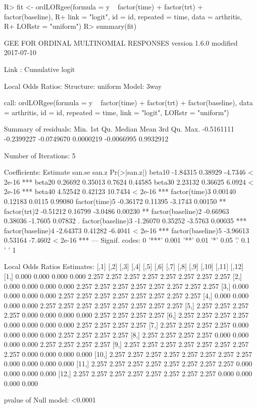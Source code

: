 \documentclass[
]{jss}
\begin{document}
\begin{CodeChunk}

\begin{CodeInput}
R>  fit <- ordLORgee(formula = y ~ factor(time) + factor(trt) + factor(baseline),
R+         link = "logit", id = id, repeated = time, data = arthritis,
R+         LORstr = "uniform")
R>  summary(fit)
\end{CodeInput}

\begin{CodeOutput}
GEE FOR ORDINAL MULTINOMIAL RESPONSES 
version 1.6.0 modified 2017-07-10 

Link : Cumulative logit 

Local Odds Ratios:
Structure:         uniform
Model:             3way

call:
ordLORgee(formula = y ~ factor(time) + factor(trt) + factor(baseline), 
    data = arthritis, id = id, repeated = time, link = "logit", 
    LORstr = "uniform")

Summary of residuals:
      Min.    1st Qu.     Median       Mean    3rd Qu.       Max. 
-0.5161111 -0.2399227 -0.0749670  0.0000219 -0.0066995  0.9932912 

Number of Iterations: 5 

Coefficients:
                  Estimate   san.se   san.z Pr(>|san.z|)    
beta10            -1.84315  0.38929 -4.7346      < 2e-16 ***
beta20             0.26692  0.35013  0.7624      0.44585    
beta30             2.23132  0.36625  6.0924      < 2e-16 ***
beta40             4.52542  0.42123 10.7434      < 2e-16 ***
factor(time)3      0.00140  0.12183  0.0115      0.99080    
factor(time)5     -0.36172  0.11395 -3.1743      0.00150 ** 
factor(trt)2      -0.51212  0.16799 -3.0486      0.00230 ** 
factor(baseline)2 -0.66963  0.38036 -1.7605      0.07832 .  
factor(baseline)3 -1.26070  0.35252 -3.5763      0.00035 ***
factor(baseline)4 -2.64373  0.41282 -6.4041      < 2e-16 ***
factor(baseline)5 -3.96613  0.53164 -7.4602      < 2e-16 ***
---
Signif. codes:  0 '***' 0.001 '**' 0.01 '*' 0.05 '.' 0.1 ' ' 1

Local Odds Ratios Estimates:
       [,1]  [,2]  [,3]  [,4]  [,5]  [,6]  [,7]  [,8]  [,9] [,10] [,11] [,12]
 [1,] 0.000 0.000 0.000 0.000 2.257 2.257 2.257 2.257 2.257 2.257 2.257 2.257
 [2,] 0.000 0.000 0.000 0.000 2.257 2.257 2.257 2.257 2.257 2.257 2.257 2.257
 [3,] 0.000 0.000 0.000 0.000 2.257 2.257 2.257 2.257 2.257 2.257 2.257 2.257
 [4,] 0.000 0.000 0.000 0.000 2.257 2.257 2.257 2.257 2.257 2.257 2.257 2.257
 [5,] 2.257 2.257 2.257 2.257 0.000 0.000 0.000 0.000 2.257 2.257 2.257 2.257
 [6,] 2.257 2.257 2.257 2.257 0.000 0.000 0.000 0.000 2.257 2.257 2.257 2.257
 [7,] 2.257 2.257 2.257 2.257 0.000 0.000 0.000 0.000 2.257 2.257 2.257 2.257
 [8,] 2.257 2.257 2.257 2.257 0.000 0.000 0.000 0.000 2.257 2.257 2.257 2.257
 [9,] 2.257 2.257 2.257 2.257 2.257 2.257 2.257 2.257 0.000 0.000 0.000 0.000
[10,] 2.257 2.257 2.257 2.257 2.257 2.257 2.257 2.257 0.000 0.000 0.000 0.000
[11,] 2.257 2.257 2.257 2.257 2.257 2.257 2.257 2.257 0.000 0.000 0.000 0.000
[12,] 2.257 2.257 2.257 2.257 2.257 2.257 2.257 2.257 0.000 0.000 0.000 0.000

pvalue of Null model: <0.0001 
\end{CodeOutput}
\end{CodeChunk}
\end{document}
